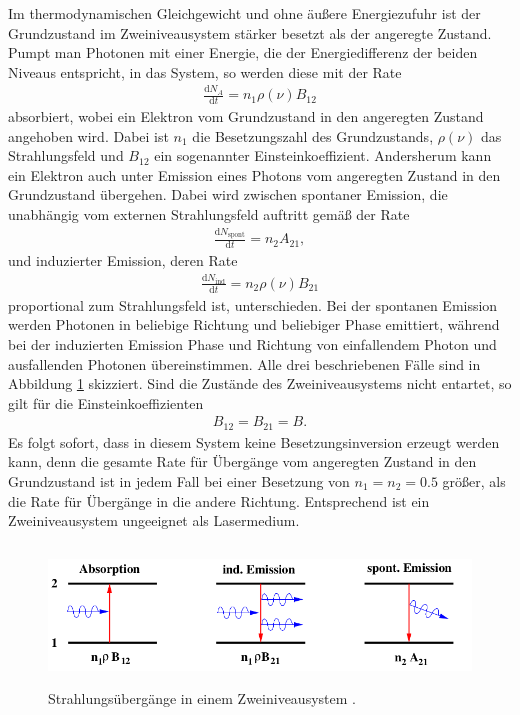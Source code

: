 Im thermodynamischen Gleichgewicht und ohne äußere Energiezufuhr ist der Grundzustand im
Zweiniveausystem stärker besetzt als der angeregte Zustand. Pumpt man Photonen mit einer Energie,
die der Energiedifferenz der beiden Niveaus entspricht, in das System, so werden diese mit der Rate
\begin{align}
  \frac{\mathrm{d}{N}_A}{\mathrm{d}t} = n_1 \rho(\nu) B_{12}
\end{align}
absorbiert, wobei ein Elektron vom Grundzustand in den angeregten Zustand angehoben wird. Dabei ist $n_1$
die Besetzungszahl des Grundzustands, $\rho(\nu)$ das Strahlungsfeld und $B_{12}$ ein sogenannter
Einsteinkoeffizient. Andersherum kann ein Elektron auch unter Emission eines Photons vom angeregten
Zustand in den Grundzustand übergehen. Dabei wird zwischen spontaner Emission, die unabhängig vom
externen Strahlungsfeld auftritt gemäß der Rate
\begin{align}
  \frac{\mathrm{d}{N}_\text{spont}}{\mathrm{d}t} = n_2 A_{21},
\end{align}
und induzierter Emission, deren Rate
\begin{align}
  \frac{\mathrm{d}{N}_\text{ind}}{\mathrm{d}t} = n_2 \rho(\nu) B_{21}
\end{align}
proportional zum Strahlungsfeld ist, unterschieden. Bei der spontanen Emission werden Photonen in beliebige
Richtung und beliebiger Phase emittiert, während bei der induzierten Emission Phase und Richtung von einfallendem
Photon und ausfallenden Photonen übereinstimmen. Alle drei beschriebenen Fälle sind in Abbildung
\ref{fig:absemi} skizziert. Sind die Zustände des Zweiniveausystems nicht entartet, so gilt für die
Einsteinkoeffizienten
\begin{align}
  B_{12} = B_{21} = B.
\end{align}
Es folgt sofort, dass in diesem System keine Besetzungsinversion erzeugt werden kann, denn die
gesamte Rate für Übergänge vom angeregten Zustand in den Grundzustand ist in jedem Fall bei
einer Besetzung von $n_1 = n_2 = 0.5$ größer, als die Rate für Übergänge in die andere Richtung.
Entsprechend ist ein Zweiniveausystem ungeeignet als Lasermedium.

\begin{figure}[H]
  \centering
  \includegraphics[height = 3.7cm]{Pics von Buddy/absemi.png}
  \caption{Strahlungsübergänge in einem Zweiniveausystem \cite{anleitung}.}
  \label{fig:absemi}
\end{figure}

